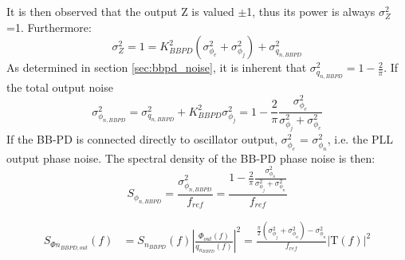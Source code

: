 	 It is then observed that the output Z is valued $\pm$1, thus its power is always $\sigma_Z^2$=1. Furthermore:
	\begin{equation}
	 	\sigma^2_{Z} = 1 = K_{BBPD}^2(\sigma^2_{\phi_e} +\sigma^2_{\phi_j})  + \sigma^2_{q_{n,BBPD}}
	\end{equation}
	 As determined in section \ref{sec:bbpd_noise}, it is inherent that $\sigma^2_{q_{n,BBPD}} = 1 - \frac{2}{\pi}$. If the total output noise
			\begin{equation}
				\sigma^2_{\phi_{n,BBPD}} =  \sigma^2_{q_{n,BBPD}} + K_{BBPD}^2\sigma^2_{\phi_j} =  1 - \frac{2}{\pi}\frac{\sigma^2_{\phi_e}}{\sigma^2_{\phi_j} + \sigma^2_{\phi_e}}
			\end{equation}
	If the BB-PD is connected directly to oscillator output, $\sigma^2_{\phi_e}$ = $\sigma^2_{\phi_n}$, i.e. the PLL output phase noise. The spectral density of the BB-PD phase noise is then:
		\begin{equation}
			S_{\phi_{n,BBPD}} = \frac{\sigma^2_{\phi_{n,BBPD}}}{f_{ref}} =  \frac{1 - \frac{2}{\pi}\frac{\sigma^2_{\phi_n}}{\sigma^2_{\phi_j} + \sigma^2_{\phi_n}}}{f_{ref}}
		\end{equation}

		\begin{align}\label{eq:out_psd_bbpd_pll3}
			S_{\Phi n_{BBPD,out}}(f) &= S_{n_{BBPD}}(f)\left|\frac{\Phi_{out}(f)}{q_{n_{BBPD}}(f)}\right|^2 = \frac{\frac{\pi}{2}(\sigma^2_{\phi_j} + \sigma^2_{\phi_n})-\sigma^2_{\phi_n}}{f_{ref}}\left|\mathrm{T}(f)\right|^2
		\end{align}



